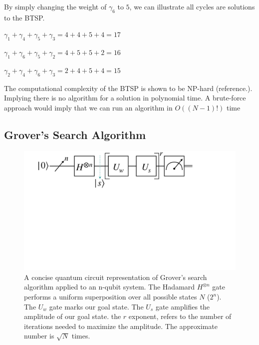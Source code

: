 \documentclass[twocolumn,showpacs,preprintnumbers,amsmath,amssymb]{revtex4}
\begin{document}
		By simply changing the weight of $\gamma_6$ to $5$, we can illustrate all cycles are solutions to the BTSP. 
		
		\begin{center}

			$\gamma_1 + \gamma_4 + \gamma_5 + \gamma_3 = 4 + 4 + 5 + 4 = 17$
			
			$ \gamma_1 + \gamma_6 + \gamma_5 + \gamma_2 = 4 + 5 + 5 + 2 = 16$
			
			$  \gamma_2 + \gamma_4 + \gamma_6 + \gamma_3 = 2 + 4 + 5 + 4 = 15$
		\end{center}
		
		The computational complexity of the BTSP is shown to be NP-hard (reference.). Implying there is no algorithm for a solution in polynomial time. A brute-force approach would imply that we can run an algorithm in $O((N-1)!)$ time
	
		
		\subsection{Grover's Search Algorithm}
		
		\begin{figure}[!h]
			\centering
			\includegraphics[trim={4.5cm 26cm 15cm 0},clip, width=0.99 \linewidth]{"graphics/grov_circ"}
			\caption{A concise quantum circuit representation of Grover's search algorithm applied to an n-qubit system. The Hadamard $H^{\otimes n }$ gate performs a uniform superposition over all possible states $N$ ($2^n$). The $U_w$ gate marks our goal state. The $U_s$ gate amplifies the amplitude of our goal state. the $r$ exponent, refers to the number of iterations needed to maximize the amplitude. The approximate number is $\sqrt{N}$ times.}
			\label{fig:grovercircuit}
		\end{figure}
		
\end{document}
